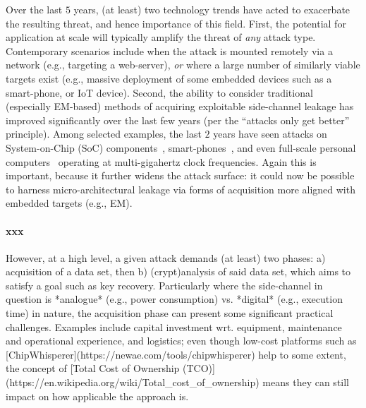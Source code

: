 Over the last $5$ years, (at least) two technology trends have acted to
exacerbate the resulting threat, and hence importance of this field.
First, the potential for application at scale will typically amplify the 
threat of {\em any} attack type.  Contemporary scenarios include when the 
attack is mounted remotely via a network (e.g., targeting a web-server), 
{\em or} where a large number of similarly viable targets exist (e.g., 
massive deployment of some embedded devices such as a smart-phone, or IoT
device).  
Second, the ability to consider traditional (especially EM-based) methods
of acquiring exploitable side-channel leakage has improved significantly
over the last few years (per the ``attacks only get better'' principle).  
Among selected examples, the last $2$ years have seen attacks on
System-on-Chip (SoC) components~\cite{complex1}, 
smart-phones~\cite{complex2},
and even
full-scale personal computers~\cite{complex3} 
operating at multi-gigahertz clock frequencies.  Again this is important,
because it further widens the attack surface: it could now be possible to
harness micro-architectural leakage via forms of acquisition more aligned 
with embedded targets (e.g., EM).


\paragraph{xxx}

However, at a high level, a given attack demands (at least) two phases:
a) acquisition of a data set,
   then
b) (crypt)analysis of said data set, which aims to satisfy a goal such as
   key recovery.
Particularly where the side-channel in question is
*analogue* (e.g., power consumption)
vs.
 *digital* (e.g., execution time)
in nature, the acquisition phase can present some significant
practical challenges.  Examples include
capital investment wrt. equipment, maintenance and operational experience, and logistics;
even though low-cost platforms such as
[ChipWhisperer](https://newae.com/tools/chipwhisperer)
help to some extent, the concept of
[Total Cost of Ownership (TCO)](https://en.wikipedia.org/wiki/Total_cost_of_ownership)
means they can still impact on how applicable the approach is.

